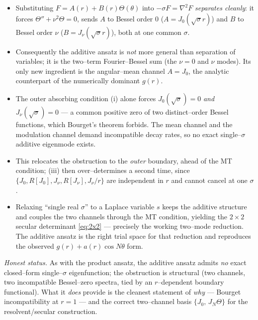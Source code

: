 \documentclass{article}
\begin{document}
\begin{itemize}
\item Substituting $F=A(r)+B(r)\Theta(\theta)$ into $-\sigma F=\nabla^2F$
\emph{separates cleanly}: it forces $\Theta''+\nu^2\Theta=0$, sends $A$ to
Bessel order $0$ ($A=J_0(\sqrt\sigma r)$) and $B$ to Bessel order $\nu$
($B=J_\nu(\sqrt\sigma r)$), both at one common $\sigma$.
\item Consequently the additive ansatz is \emph{not} more general than
separation of variables; it is the two--term Fourier--Bessel sum (the $\nu=0$
and $\nu$ modes). Its only new ingredient is the angular--mean channel
$A=J_0$, the analytic counterpart of the numerically dominant $g(r)$.
\item The outer absorbing condition (i) alone forces $J_0(\sqrt\sigma)=0$
\emph{and} $J_\nu(\sqrt\sigma)=0$ --- a common positive zero of two
distinct--order Bessel functions, which Bourget's theorem forbids. The mean
channel and the modulation channel demand incompatible decay rates, so no exact
single--$\sigma$ additive eigenmode exists.
\item This relocates the obstruction to the \emph{outer} boundary, ahead of the
MT condition; (iii) then over--determines a second time, since
$\{J_0,R[J_0],J_\nu,R[J_\nu],J_\nu/r\}$ are independent in $r$ and cannot cancel
at one $\sigma$.
\item Relaxing ``single real $\sigma$'' to a Laplace variable $s$ keeps the
additive structure and couples the two channels through the MT condition,
yielding the $2\times2$ secular determinant \eqref{eq:2x2} --- precisely the
working two--mode reduction. The additive ansatz is the right trial space for
that reduction and reproduces the observed $g(r)+a(r)\cos N\theta$ form.
\end{itemize}

\noindent\textit{Honest status.} As with the product ansatz, the additive ansatz
admits \emph{no} exact closed--form single--$\sigma$ eigenfunction; the
obstruction is structural (two channels, two incompatible Bessel--zero spectra,
tied by an $r$--dependent boundary functional). What it \emph{does} provide is
the cleanest statement of \emph{why} --- Bourget incompatibility at $r=1$ --- and
the correct two--channel basis $\{J_0,\,J_N\Theta\}$ for the resolvent/secular
construction.
\end{document}
